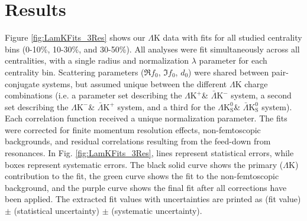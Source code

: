 \documentclass[ALICE,manyauthors]{cernphprep}
\newcommand{\LamK}{$\Lambda$K\xspace}
\newcommand{\LamKchP}{$\Lambda\mathrm{K^{+}}$\xspace}
\newcommand{\ALamKchM}{$\bar{\Lambda}\mathrm{K^{-}}$\xspace}
\newcommand{\LamKchM}{$\Lambda\mathrm{K^{-}}$\xspace}
\newcommand{\ALamKchP}{$\bar{\Lambda}\mathrm{K^{+}}$\xspace}
\newcommand{\LamKs}{$\Lambda\mathrm{K^{0}_{S}}$\xspace}
\newcommand{\ALamKs}{$\bar{\Lambda}\mathrm{K^{0}_{S}}$\xspace}
\begin{document}
\section{Results}
\label{sec:Results}

Figure \ref{fig:LamKFits_3Res} shows our \LamK data with fits for all studied centrality bins (0-10\%, 10-30\%, and 30-50\%). 
All analyses were fit simultaneously across all centralities, with a single radius and normalization $\lambda$ parameter for each centrality bin.
Scattering parameters ($\Re f_{0}$, $\Im f_{0}$, $d_{0}$) were shared between pair-conjugate systems, but assumed unique between the different \LamK charge combinations (i.e. a parameter set describing the \LamKchP \& \ALamKchM system, a second set describing the \LamKchM \& \ALamKchP system, and a third for the \LamKs \& \ALamKs system).
Each correlation function received a unique normalization parameter.
The fits were corrected for finite momentum resolution effects, non-femtoscopic backgrounds, and residual correlations resulting from the feed-down from resonances.
In Fig. \ref{fig:LamKFits_3Res}, lines represent statistical errors, while boxes represent systematic errors.  The black solid curve shows the primary (\LamK) contribution to the fit, the green curve shows the fit to the non-femtoscopic background, and the purple curve shows the final fit after all corrections have been applied.
The extracted fit values with uncertainties are printed as (fit value) $\pm$ (statistical uncertainty) $\pm$ (systematic uncertainty).
\end{document}
